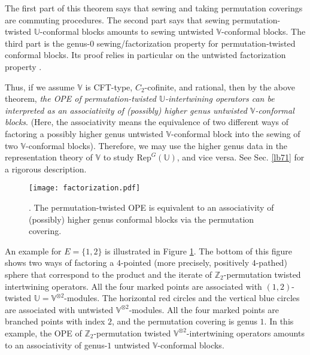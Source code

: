 \documentclass[11pt,b5paper,notitlepage]{article}
\theoremstyle{definition}
\theoremstyle{plain}
\newcommand{\Rep}{\mathrm{Rep}}
\newcommand{\Vbb}{\mathbb V}
\newcommand{\Ubb}{\mathbb U}
\newcommand{\Zbb}{\mathbb Z}
\numberwithin{equation}{subsection}
\begin{document}
The first part of this theorem says that sewing and taking permutation coverings are commuting procedures. The second part says that sewing  permutation-twisted $\Ubb$-conformal blocks amounts to sewing untwisted $\Vbb$-conformal blocks. The third part is the genus-$0$ sewing/factorization property for permutation-twisted conformal blocks. Its proof relies in particular on the untwisted factorization property \cite{DGT22}.




Thus, if we assume $\Vbb$ is CFT-type, $C_2$-cofinite, and rational, then by the above theorem, \textit{the OPE of permutation-twisted $\Ubb$-intertwining operators can be interpreted as an associativity of (possibly) higher genus untwisted $\Vbb$-conformal blocks}. (Here, the associativity means the equivalence of two different ways of factoring a possibly higher genus  untwisted $\Vbb$-conformal block into the sewing of two $\Vbb$-conformal blocks).  Therefore, we may use the higher genus data in the representation theory of $\Vbb$ to study $\Rep^G(\Ubb)$, and vice versa. See Sec. \ref{lb71} for a rigorous description.

\begin{figure}[h]
	\centering
	\texttt{[image: factorization.pdf]}
	\caption{. The permutation-twisted OPE is equivalent to an associativity of  (possibly) higher genus conformal blocks via the permutation covering.}
	\label{fig2}
\end{figure}


An example for $E=\{1,2\}$ is illustrated in Figure \ref{fig2}. The bottom of this figure shows two ways of factoring a $4$-pointed (more precisely, positively $4$-pathed) sphere that correspond to the product and the iterate of $\Zbb_2$-permutation twisted intertwining operators. All the four marked points are associated with $(1,2)$-twisted $\Ubb=\Vbb^{\otimes 2}$-modules. The horizontal red circles and the vertical blue circles are associated with  untwisted $\Vbb^{\otimes 2}$-modules. All the four marked points are branched points with index $2$, and the permutation covering is genus $1$. In this example, the OPE of $\Zbb_2$-permutation twisted $\Vbb^{\otimes 2}$-intertwining operators amounts to an associativity of genus-$1$ untwisted $\Vbb$-conformal blocks. 
\end{document}
